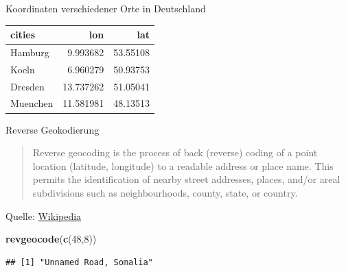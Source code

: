 \documentclass[ignorenonframetext,]{beamer}
\newenvironment{Shaded}{}{}
\newcommand{\KeywordTok}[1]{\textcolor[rgb]{0.00,0.44,0.13}{\textbf{{#1}}}}
\newcommand{\DecValTok}[1]{\textcolor[rgb]{0.25,0.63,0.44}{{#1}}}
\newcommand{\NormalTok}[1]{{#1}}
\begin{document}
\begin{frame}{Koordinaten verschiedener Orte in Deutschland}

\begin{longtable}[]{@{}lrr@{}}
\toprule
cities & lon & lat\tabularnewline
\midrule
\endhead
Hamburg & 9.993682 & 53.55108\tabularnewline
Koeln & 6.960279 & 50.93753\tabularnewline
Dresden & 13.737262 & 51.05041\tabularnewline
Muenchen & 11.581981 & 48.13513\tabularnewline
\bottomrule
\end{longtable}

\end{frame}

\begin{frame}[fragile]{Reverse Geokodierung}

\begin{quote}
Reverse geocoding is the process of back (reverse) coding of a point
location (latitude, longitude) to a readable address or place name. This
permits the identification of nearby street addresses, places, and/or
areal subdivisions such as neighbourhoods, county, state, or country.
\end{quote}

Quelle:
\href{https://en.wikipedia.org/wiki/Reverse_geocoding}{Wikipedia}

\begin{Shaded}
\begin{Highlighting}[]
\KeywordTok{revgeocode}\NormalTok{(}\KeywordTok{c}\NormalTok{(}\DecValTok{48}\NormalTok{,}\DecValTok{8}\NormalTok{))}
\end{Highlighting}
\end{Shaded}

\begin{verbatim}
## [1] "Unnamed Road, Somalia"
\end{verbatim}

\end{frame}
\end{document}

